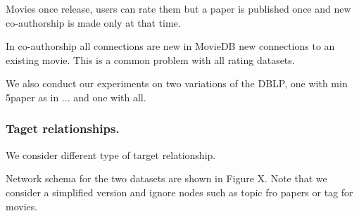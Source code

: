 


Movies once release, users can rate them but a paper is published once and new co-authorship is made only at that time.

In co-authorship all connections are new in MovieDB new connections to an existing movie. This is a common problem with all rating datasets.

We also conduct our experiments on two variations of the DBLP, one with min 5paper as in ... and one with all.


\subsubsection{Taget relationships.} We consider different type of target relationship.

Network schema for the two datasets are shown in Figure X. Note that we consider a simplified version and ignore nodes such as topic fro papers or tag for movies.


